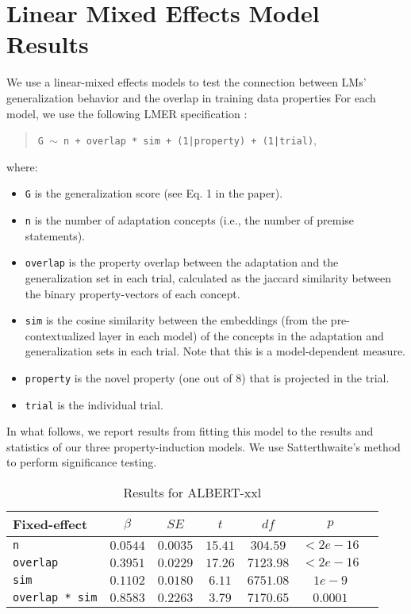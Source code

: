 \documentclass[11pt]{article}    %
\begin{document}
\section{Linear Mixed Effects Model Results}
We use a linear-mixed effects models to test the connection between LMs’ generalization behavior and the overlap in training data properties
For each model, we use the following LMER specification \citep{lme4}:
\begin{quote}
    \centering
    \texttt{G $\sim$ n + overlap * sim + (1|property) + (1|trial)},
\end{quote}
where:
\begin{itemize}
    \item \texttt{G} is the generalization score (see Eq. 1 in the paper).
    \item \texttt{n} is the number of adaptation concepts (i.e., the number of premise statements).
    \item \texttt{overlap} is the property overlap between the adaptation and the generalization set in each trial, calculated as the jaccard similarity between the binary property-vectors of each concept.
    \item \texttt{sim} is the cosine similarity between the embeddings (from the pre-contextualized layer in each model) of the concepts in the adaptation and generalization sets in each trial. Note that this is a model-dependent measure.
    \item \texttt{property} is the novel property (one out of 8) that is projected in the trial.
    \item \texttt{trial} is the individual trial.
\end{itemize}
In what follows, we report results from fitting this model to the results and statistics of our three property-induction models. We use Satterthwaite's method \citep{lmertest} to perform significance testing.

\begin{table}[!h]
\centering
\begin{tabular}{@{}lcccccc@{}}
\toprule
Fixed-effect           & $\beta$   & $SE$     & $t$     & $df$      & $p$      \\ \midrule
\texttt{n}             & $0.0544$  & $0.0035$ & $15.41$ & $304.59$  & $<2e-16$ \\
\texttt{overlap}       & $0.3951$  & $0.0229$ & $17.26$ & $7123.98$ & $<2e-16$ \\
\texttt{sim}           & $0.1102$  & $0.0180$ & $6.11$  & $6751.08$ & $1e-9$ \\
\texttt{overlap * sim} & $0.8583$ & $0.2263$ & $3.79$ & $7170.65$ & $0.0001$  \\ \bottomrule
\end{tabular}
\caption{Results for ALBERT-xxl}
\label{tab:albert}
\end{table}
\end{document}
